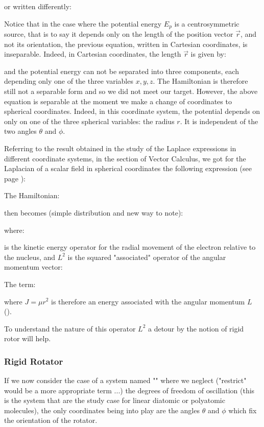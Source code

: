 	or written differently:
	
	Notice that in the case where the potential energy $E_{p}$ is a centrosymmetric source, that is to say it depends only on the length of the position vector $\vec{r}$, and not its orientation, the previous equation, written in Cartesian coordinates, is inseparable. Indeed, in Cartesian coordinates, the length $\vec{r}$ is given by:
	
	and the potential energy can not be separated into three components, each depending only one of the three variables $x, y, z$. The Hamiltonian is therefore still not a separable form and so we did not meet our target. However, the above equation is separable at the moment we make a change of coordinates to spherical coordinates. Indeed, in this coordinate system, the potential depends on only on one of the three spherical variables: the radius $r$. It is independent of the two angles $\theta$ and $\phi$.
	
	Referring to the result obtained in the study of the Laplace expressions in different coordinate systems, in the section of Vector Calculus, we got for the Laplacian of a scalar field in spherical coordinates the following expression (see page \pageref{scalar laplacian}):
	
	The Hamiltonian:
	
	then becomes (simple distribution and new way to note):
	
	where:
	
	is the kinetic energy operator for the radial movement of the electron relative to the nucleus, and $L^2$ is the squared "associated" operator of the angular momentum vector:
	
	The term:
	
	where $J=\mu r^2$ is therefore an energy associated with the angular momentum $L$ ().
	
	To understand the nature of this operator $L^2$ a detour by the notion of rigid rotor will help.
	
	\subsubsection{Rigid Rotator}\label{quantum chemistry rigid rotator}
	If we now consider the case of a system named "" where we neglect ("restrict" would be a more appropriate term ...) the degrees of freedom of oscillation (this is the system that are the study case for linear diatomic or polyatomic molecules), the only coordinates being into play are the angles $\theta$ and $\phi$ which fix the orientation of the rotator.
	
